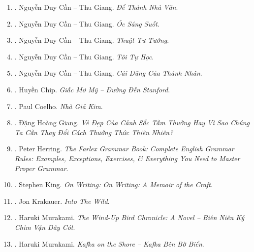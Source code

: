\documentclass{article}
\begin{document}
\begin{enumerate}
	\item \cite{Can_dtnv}. {\sc Nguyễn Duy Cần -- Thu Giang}. {\it Để Thành Nhà Văn}.\hfill{\sf[done]}
	
	\item \cite{Can_oss}. {\sc Nguyễn Duy Cần -- Thu Giang}. {\it Óc Sáng Suốt}.\hfill{\sf[reading]}
	
	\item \cite{Can_ttt}. {\sc Nguyễn Duy Cần -- Thu Giang}. {\it Thuật Tư Tưởng}.\hfill{\sf[reading]}
	
	\item \cite{Can_tth}. {\sc Nguyễn Duy Cần -- Thu Giang}. {\it Tôi Tự Học}.\hfill{\sf[reading]}
	
	\item \cite{Can_dung_thanh_nhan}. {\sc Nguyễn Duy Cần -- Thu Giang}. {\it Cái Dũng Của Thánh Nhân}.\hfill{\sf[reading]}
	
	\item \cite{Chip_US_dream}. {\sc Huyền Chip}. {\it Giấc Mơ Mỹ -- Đường Đến Stanford}.\hfill{\sf[done]}
	
	\item \cite{Coelho_alchemist_VN}. {\sc Paul Coelho}. {\it Nhà Giả Kim}.\hfill{\sf[done]}
	
	\item \cite{Giang_nature}. {\sc Đặng Hoàng Giang}. {\it Vẻ Đẹp Của Cảnh Sắc Tầm Thường Hay Vì Sao Chúng Ta Cần Thay Đổi Cách Thưởng Thức Thiên Nhiên?}\hfill{\sf[done]}
	
	\item \cite{Herring2016}. {\sc Peter Herring}. {\it The Farlex Grammar Book: Complete English Grammar Rules: Examples, Exceptions, Exercises, \& Everything You Need to Master Proper Grammar}.\hfill{\sf[reading]}
	
	\item \cite{King2000, King2010}. Stephen King. {\it On Writing: On Writing: A Memoir of the Craft}.\hfill{\sf[done]}
	
	\item \cite{Krakauer_wild}. {\sc Jon Krakauer}. {\it Into The Wild}.
	
	\item \cite{Murakami_bird}. Haruki Murakami. {\it The Wind-Up Bird Chronicle: A Novel -- Biên Niên Ký Chim Vặn Dây Cót}.\hfill{\sf[done]}
	
	\item \cite{Murakami_Kafka}. Haruki Murakami. {\it Kafka on the Shore -- Kafka Bên Bờ Biển}.\hfill{\sf[done]}
	

\end{enumerate}
\end{document}
